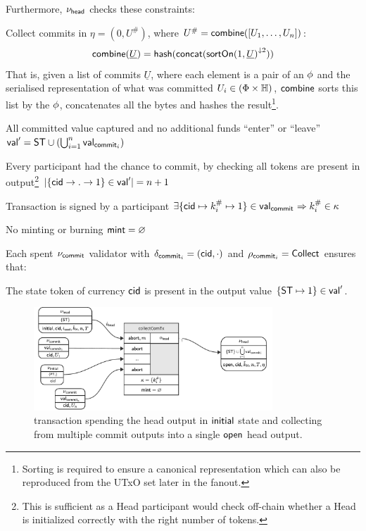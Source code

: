 \begin{samepage}
	\noindent Furthermore, $\nu_\mathsf{head}$ checks these constraints:
	\begin{menumerate}
		\item Collect commits in $\eta = (0, U^{\#})$, where
		$U^{\#} = \mathsf{combine}([U_{1}, \dots, U_{n}])$:
		\[
			\mathsf{combine}(\underline{U}) = \mathsf{hash}(\mathsf{concat}({\mathsf{sortOn}(1, \underline{U})}^{\downarrow2}))
		\]
		That is, given a list of commits $\underline{U}$, where each element is a pair
		of an $\phi$ and the serialised representation of what was committed
		$U_{i} \in (\Phi \times \mathbb{H})$, $\mathsf{combine}$ sorts this list by the
		$\phi$, concatenates all the bytes and hashes the
		result\footnote{Sorting is required to ensure a canonical representation
			which can also be reproduced from the UTxO set later in the fanout.}.

		\item All committed value captured and no additional funds ``enter'' or ``leave''\\
		$\mathsf{val}' = \mathsf{ST} \cup (\bigcup_{i=1}^{n} \mathsf{val}_{\mathsf{commit}_{i}})$
		\item Every participant had the chance to commit, by checking all tokens are present in output\footnote{This is sufficient as a Head participant would check off-chain whether a Head is initialized correctly with the right number of tokens.}
		$|\{\mathsf{cid} \rightarrow . \rightarrow 1\} \in \mathsf{val}'| = n + 1$
		\item Transaction is signed by a participant $\exists \{\mathsf{cid} \mapsto k^{\#}_{i} \mapsto 1\} \in \mathsf{val}_{\mathsf{commit}_{}} \Rightarrow k^{\#}_{i} \in \kappa$
		\item No minting or burning  $\mathsf{mint} = \varnothing$
	\end{menumerate}
\end{samepage}

\noindent Each spent $\nu_{\mathsf{commit}}$ validator with $\delta_{\mathsf{commit}_{i}} = (\mathsf{cid},\cdot)$ and $\rho_{\mathsf{commit}_{i}} = \mathsf{Collect}$ ensures that:
\begin{menumerate}
	\item The state token of currency $\mathsf{cid}$ is present in the output value
	$\{\mathsf{ST} \mapsto 1\} \in \mathsf{val}'$.
\end{menumerate}

\begin{figure}[h]
	\centering
	\includegraphics[width=0.8\textwidth]{figures/collectComTx.pdf}
	\caption{\mtxCCom{} transaction spending the head output in $\mathsf{initial}$
		state and collecting from multiple commit outputs into a single
		$\mathsf{open}$ head output.}\label{fig:collectComTx}
\end{figure}

